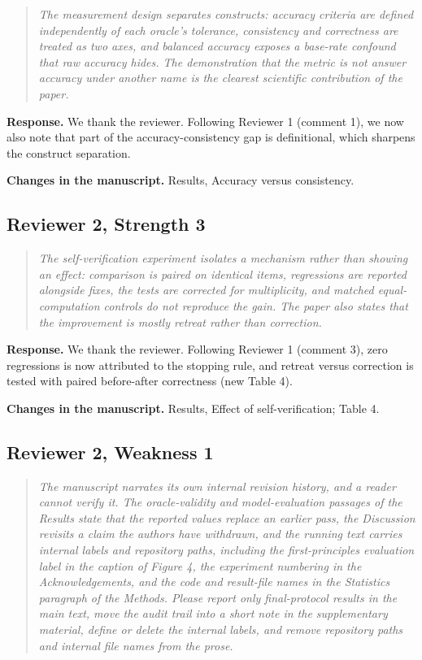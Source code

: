 \documentclass[11pt,a4paper]{article}
\newenvironment{reviewer}{\begin{quote}\itshape\small}{\end{quote}}
\begin{document}
\begin{reviewer}The measurement design separates constructs: accuracy criteria are defined independently of each oracle's tolerance, consistency and correctness are treated as two axes, and balanced accuracy exposes a base-rate confound that raw accuracy hides. The demonstration that the metric is not answer accuracy under another name is the clearest scientific contribution of the paper.\end{reviewer}

\textbf{Response.} We thank the reviewer. Following Reviewer 1 (comment 1), we now also note that part of the accuracy-consistency gap is definitional, which sharpens the construct separation.

\textbf{Changes in the manuscript.} Results, Accuracy versus consistency.

\subsection*{Reviewer 2, Strength 3}

\begin{reviewer}The self-verification experiment isolates a mechanism rather than showing an effect: comparison is paired on identical items, regressions are reported alongside fixes, the tests are corrected for multiplicity, and matched equal-computation controls do not reproduce the gain. The paper also states that the improvement is mostly retreat rather than correction.\end{reviewer}

\textbf{Response.} We thank the reviewer. Following Reviewer 1 (comment 3), zero regressions is now attributed to the stopping rule, and retreat versus correction is tested with paired before-after correctness (new Table 4).

\textbf{Changes in the manuscript.} Results, Effect of self-verification; Table 4.

\subsection*{Reviewer 2, Weakness 1}

\begin{reviewer}The manuscript narrates its own internal revision history, and a reader cannot verify it. The oracle-validity and model-evaluation passages of the Results state that the reported values replace an earlier pass, the Discussion revisits a claim the authors have withdrawn, and the running text carries internal labels and repository paths, including the first-principles evaluation label in the caption of Figure 4, the experiment numbering in the Acknowledgements, and the code and result-file names in the Statistics paragraph of the Methods. Please report only final-protocol results in the main text, move the audit trail into a short note in the supplementary material, define or delete the internal labels, and remove repository paths and internal file names from the prose.\end{reviewer}
\end{document}
